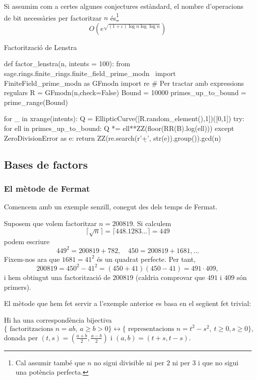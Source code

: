  \begin{theorem}[Lenstra]
 Si assumim com a certes algunes conjectures estàndard, el nombre d'operacions de bit necessàries per factoritzar $n$ és\footnote{Cal assumir també que $n$ no sigui divisible ni per $2$ ni per $3$ i que no sigui una potència perfecta.}
 \[
 O\left(e^{\sqrt{(1+\varepsilon)\log n \log\log n}}\right)
 \]
 \end{theorem}

 \begin{algo}
   \caption{Factorització de Lenstra}
 \begin{python}
 def factor_lenstra(n, intents = 100):
    from sage.rings.finite_rings.finite_field_prime_modn \ 
        import FiniteField_prime_modn as GFmodn
    import re # Per tractar amb expressions regulars
    R = GFmodn(n,check=False)
    Bound = 10000
    primes_up_to_bound = prime_range(Bound)

    for _ in xrange(intents):
        Q = EllipticCurve([R.random_element(),1])([0,1])
        try:
            for ell in primes_up_to_bound:
                Q *= ell**ZZ(floor(RR(B).log(ell)))
        except ZeroDivisionError as e:
            return ZZ(re.search(r'\d+', str(e)).group()).gcd(n)
\end{python}
\end{algo}

 \subsection{Bases de factors}
 
 \subsubsection{El mètode de Fermat}
 Comencem amb un exemple senzill, conegut des dels temps de Fermat.

 \begin{example}
  
Suposem que volem factoritzar $n=200819$. Si calculem
 \[
 \lceil\sqrt{n}\rceil=\lceil448.1283\ldots\rceil=449
 \]
 podem escriure
 \[
 449^2 = 200819 + 782,\quad 450 = 200819 + 1681,\ldots
 \]
 Fixem-nos ara que $1681=41^2$ és un quadrat perfecte. Per tant,
 \[
 200819 = 450^2 - 41^2 = (450+41)(450-41) = 491\cdot 409,
 \]
 i hem obtingut una factorització de $200819$ (caldria comprovar que $491$ i $409$ són primers).
  \end{example}
 El mètode que hem fet servir a l'exemple anterior es basa en el següent fet trivial:
 \begin{lemma}
Hi ha una correspondència bijectiva
\[
\{\text{ factoritzacions } n=ab,\ a\geq b>0\}\longleftrightarrow \{\text{ representacions } n=t^2-s^2,\ t\geq 0,s\geq 0\},
\]
donada per $(t,s) = (\frac{a+b}{2},\frac{a-b}{2})$ i $(a,b)=(t+s,t-s)$.
 \end{lemma}
 
